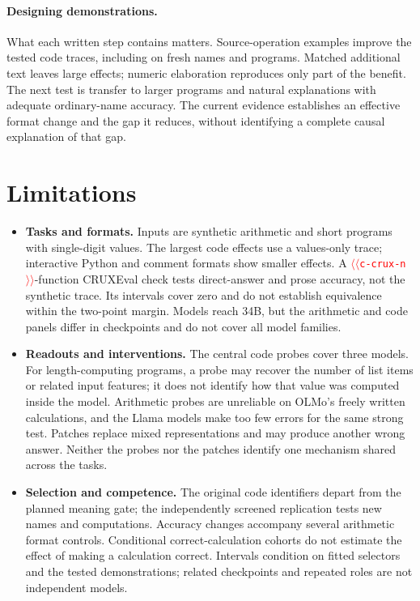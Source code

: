 \documentclass[11pt]{article}
\providecommand{\NUM}[1]{\textcolor{red}{$\langle\langle$\texttt{#1}$\rangle\rangle$}}
\begin{document}
\paragraph{Designing demonstrations.} What each written step contains matters.
Source-operation examples improve the tested code traces, including on fresh
names and programs. Matched additional text leaves large effects; numeric
elaboration reproduces only part of the benefit. The next test is transfer to
larger programs and natural explanations with adequate ordinary-name accuracy.
The current evidence establishes an effective format change and the gap it
reduces, without identifying a complete causal explanation of that gap.

\section*{Limitations}

\begin{itemize}
\item \textbf{Tasks and formats.} Inputs are synthetic arithmetic and short programs
with single-digit values. The largest code effects use a values-only trace;
interactive Python and comment formats show smaller effects. A
\NUM{c-crux-n}-function CRUXEval check tests direct-answer and prose accuracy, not
the synthetic trace. Its intervals cover zero and do not establish equivalence
within the two-point margin. Models reach 34B, but the arithmetic and code panels
differ in checkpoints and do not cover all model families.
\item \textbf{Readouts and interventions.} The central code probes cover three models.
For length-computing programs, a probe may recover the number of list items or
related input features; it does not identify how that value was computed inside
the model. Arithmetic probes are unreliable on OLMo's freely written calculations,
and the Llama models make too few errors for the same strong test. Patches replace mixed
representations and may produce another wrong answer. Neither the probes nor the
patches identify one mechanism shared across the tasks.
\item \textbf{Selection and competence.} The original code identifiers depart from the
planned meaning gate; the independently screened replication tests new names and
computations. Accuracy changes accompany several arithmetic format controls.
Conditional correct-calculation cohorts do not estimate the effect of making
a calculation correct. Intervals condition on fitted selectors and the tested
demonstrations; related checkpoints and repeated roles are not independent models.
\end{itemize}


\appendix



\end{document}
